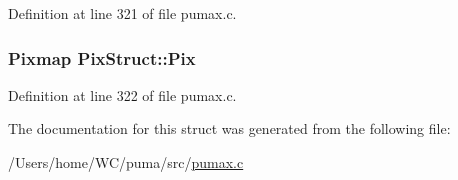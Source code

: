 \-Definition at line 321 of file pumax.\-c.

\hypertarget{struct_pix_struct_a7e7807591a26e2daa2f16ad2599a2b34}{
\subsubsection[{\-Pix}]{\setlength{\rightskip}{0pt plus 5cm}\-Pixmap {\bf \-Pix\-Struct\-::\-Pix}}}
\label{struct_pix_struct_a7e7807591a26e2daa2f16ad2599a2b34}


\-Definition at line 322 of file pumax.\-c.



\-The documentation for this struct was generated from the following file\-:\begin{DoxyCompactItemize}
\item 
/\-Users/home/\-W\-C/puma/src/\hyperlink{pumax_8c}{pumax.\-c}\end{DoxyCompactItemize}
